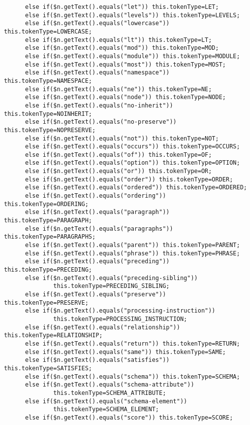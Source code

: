 \begin{verbatim}
      else if($n.getText().equals("let")) this.tokenType=LET;
      else if($n.getText().equals("levels")) this.tokenType=LEVELS;
      else if($n.getText().equals("lowercase")) this.tokenType=LOWERCASE;
      else if($n.getText().equals("lt")) this.tokenType=LT;
      else if($n.getText().equals("mod")) this.tokenType=MOD;
      else if($n.getText().equals("module")) this.tokenType=MODULE;
      else if($n.getText().equals("most")) this.tokenType=MOST;
      else if($n.getText().equals("namespace")) this.tokenType=NAMESPACE;
      else if($n.getText().equals("ne")) this.tokenType=NE;
      else if($n.getText().equals("node")) this.tokenType=NODE;
      else if($n.getText().equals("no-inherit")) this.tokenType=NOINHERIT;
      else if($n.getText().equals("no-preserve")) this.tokenType=NOPRESERVE;
      else if($n.getText().equals("not")) this.tokenType=NOT;
      else if($n.getText().equals("occurs")) this.tokenType=OCCURS;
      else if($n.getText().equals("of")) this.tokenType=OF;
      else if($n.getText().equals("option")) this.tokenType=OPTION;
      else if($n.getText().equals("or")) this.tokenType=OR;
      else if($n.getText().equals("order")) this.tokenType=ORDER;
      else if($n.getText().equals("ordered")) this.tokenType=ORDERED;
      else if($n.getText().equals("ordering")) this.tokenType=ORDERING;
      else if($n.getText().equals("paragraph")) this.tokenType=PARAGRAPH;
      else if($n.getText().equals("paragraphs")) this.tokenType=PARAGRAPHS;
      else if($n.getText().equals("parent")) this.tokenType=PARENT;
      else if($n.getText().equals("phrase")) this.tokenType=PHRASE;
      else if($n.getText().equals("preceding")) this.tokenType=PRECEDING;
      else if($n.getText().equals("preceding-sibling")) 
              this.tokenType=PRECEDING_SIBLING;
      else if($n.getText().equals("preserve")) this.tokenType=PRESERVE;
      else if($n.getText().equals("processing-instruction")) 
              this.tokenType=PROCESSING_INSTRUCTION;
      else if($n.getText().equals("relationship")) this.tokenType=RELATIONSHIP;
      else if($n.getText().equals("return")) this.tokenType=RETURN;
      else if($n.getText().equals("same")) this.tokenType=SAME;
      else if($n.getText().equals("satisfies")) this.tokenType=SATISFIES;
      else if($n.getText().equals("schema")) this.tokenType=SCHEMA;
      else if($n.getText().equals("schema-attribute")) 
              this.tokenType=SCHEMA_ATTRIBUTE;
      else if($n.getText().equals("schema-element")) 
              this.tokenType=SCHEMA_ELEMENT;
      else if($n.getText().equals("score")) this.tokenType=SCORE;

\end{verbatim}
